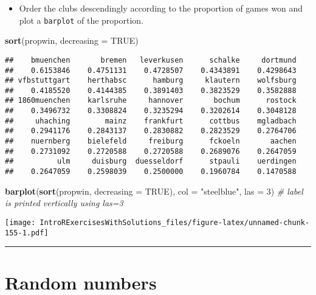 \documentclass[]{article}
\newenvironment{Shaded}{\begin{snugshade}}{\end{snugshade}}
\newcommand{\KeywordTok}[1]{\textcolor[rgb]{0.13,0.29,0.53}{\textbf{#1}}}
\newcommand{\DataTypeTok}[1]{\textcolor[rgb]{0.13,0.29,0.53}{#1}}
\newcommand{\DecValTok}[1]{\textcolor[rgb]{0.00,0.00,0.81}{#1}}
\newcommand{\StringTok}[1]{\textcolor[rgb]{0.31,0.60,0.02}{#1}}
\newcommand{\CommentTok}[1]{\textcolor[rgb]{0.56,0.35,0.01}{\textit{#1}}}
\newcommand{\OtherTok}[1]{\textcolor[rgb]{0.56,0.35,0.01}{#1}}
\newcommand{\NormalTok}[1]{#1}
\providecommand{\tightlist}{%
  \setlength{\itemsep}{0pt}\setlength{\parskip}{0pt}}
\begin{document}
\begin{itemize}
\tightlist
\item
  Order the clubs descendingly according to the proportion of games won
  and plot a \texttt{barplot} of the proportion.
\end{itemize}

\begin{Shaded}
\begin{Highlighting}[]
\KeywordTok{sort}\NormalTok{(propwin, }\DataTypeTok{decreasing =} \OtherTok{TRUE}\NormalTok{)}
\end{Highlighting}
\end{Shaded}

\begin{verbatim}
##    bmuenchen       bremen   leverkusen      schalke     dortmund 
##    0.6153846    0.4751131    0.4728507    0.4343891    0.4298643 
## vfbstuttgart    herthabsc      hamburg     klautern    wolfsburg 
##    0.4185520    0.4144385    0.3891403    0.3823529    0.3582888 
## 1860muenchen    karlsruhe     hannover       bochum      rostock 
##    0.3496732    0.3308824    0.3235294    0.3202614    0.3048128 
##     uhaching        mainz    frankfurt      cottbus    mgladbach 
##    0.2941176    0.2843137    0.2830882    0.2823529    0.2764706 
##    nuernberg    bielefeld     freiburg      fckoeln       aachen 
##    0.2731092    0.2720588    0.2720588    0.2689076    0.2647059 
##          ulm     duisburg  duesseldorf      stpauli    uerdingen 
##    0.2647059    0.2598039    0.2500000    0.1960784    0.1470588
\end{verbatim}

\begin{Shaded}
\begin{Highlighting}[]
\KeywordTok{barplot}\NormalTok{(}\KeywordTok{sort}\NormalTok{(propwin, }\DataTypeTok{decreasing =} \OtherTok{TRUE}\NormalTok{), }\DataTypeTok{col =} \StringTok{"steelblue"}\NormalTok{, }\DataTypeTok{las =} \DecValTok{3}\NormalTok{)  }\CommentTok{# label is printed vertically using las=3}
\end{Highlighting}
\end{Shaded}

\texttt{[image: IntroRExercisesWithSolutions\_files/figure-latex/unnamed-chunk-155-1.pdf]}

\begin{center}\rule{0.5\linewidth}{\linethickness}\end{center}

\section{Random numbers}\label{random-numbers}
\end{document}
